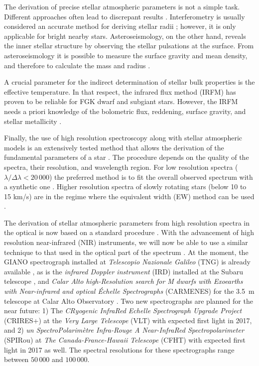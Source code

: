 \documentclass{aa}
\begin{document}
The derivation of precise stellar atmospheric parameters is not a simple task.
Different approaches often lead to discrepant results
\citep[see e.g.][]{Santos13}. Interferometry is usually considered  an accurate
method for deriving stellar radii \citep[see e.g.][]{Boyajian2012}; however, it is
only applicable for bright nearby stars. Asteroseismology, on the other hand,
reveals the inner stellar structure by observing the stellar pulsations at the
surface. From asteroseismology it is possible to measure the surface gravity and
mean density, and therefore to calculate the mass and radius
\citep[e.g.][]{Kjeldsen1995}.

A crucial parameter for the indirect determination of stellar bulk
properties is the effective temperature. In that respect, the infrared
flux method (IRFM) has proven to be reliable for FGK dwarf and
subgiant stars. However, the IRFM needs a priori knowledge of the
bolometric flux, reddening, surface gravity, and stellar metallicity
\citep{Blackwell1977,Ramirez2005b,Casagrande2010}.

Finally, the use of high resolution spectroscopy along with stellar atmospheric
models is an extensively tested method that allows the derivation of the
fundamental parameters of a star \citep[see e.g.][]{Valenti2005,Santos13}. The
procedure depends on the quality of the spectra, their resolution, and
wavelength region. For low resolution spectra ($\lambda/\Delta\lambda <
20\,000$) the preferred method is to fit the overall observed spectrum with a
synthetic one \citep[see e.g.][]{Recio2006}. Higher resolution spectra of slowly
rotating stars (below 10 to 15 \si{km/s})  are in the regime where the
equivalent width (EW) method can be used
\citep[see e.g.][for details]{Andreasen2017a}.

The derivation of stellar atmospheric parameters from high resolution spectra in
the optical is now based on a standard procedure
\citep[see e.g.][]{Valenti2005,Sousa2008a}. With the advancement of high
resolution near-infrared (NIR) instruments, we will now be able to use a similar
technique to that used in the optical part of the spectrum
\citep[see e.g.][]{Melendez1999,Sousa2008a,Tsantaki2013,Mucciarelli2013,Bensby2014}.
At the moment, the GIANO spectrograph installed at \emph{Telescopio Nazionale
Galileo} (TNG) is already available \citep{GIANO}, as is the \emph{infrared Doppler
instrument} (IRD) installed at the Subaru telescope \citep{IRD}, and
\emph{Calar Alto high-Resolution search for M dwarfs with Exoearths with
Near-infrared and optical Échelle Spectrographs} (CARMENES) for the \SI{3.5}{m}
telescope at Calar Alto Observatory \citep{CARMENES}. Two new spectrographs are
planned for the near future: 1) The \emph{CRyogenic InfraRed Echelle
Spectrograph Upgrade Project} (CRIRES+) at the \emph{Very Large Telescope} (VLT)
\citep{CRIRESp} with expected first light in 2017, and 2) \emph{un
SpectroPolarimètre Infra-Rouge A Near-InfraRed Spectropolarimeter} (SPIRou) at
\emph{The Canada-France-Hawaii Telescope} (CFHT) \citep{SPIROU1,SPIROU2} with
expected first light in 2017 as well. The spectral resolutions for these
spectrographs range between $50\,000$ and $100\,000$.
\end{document}
